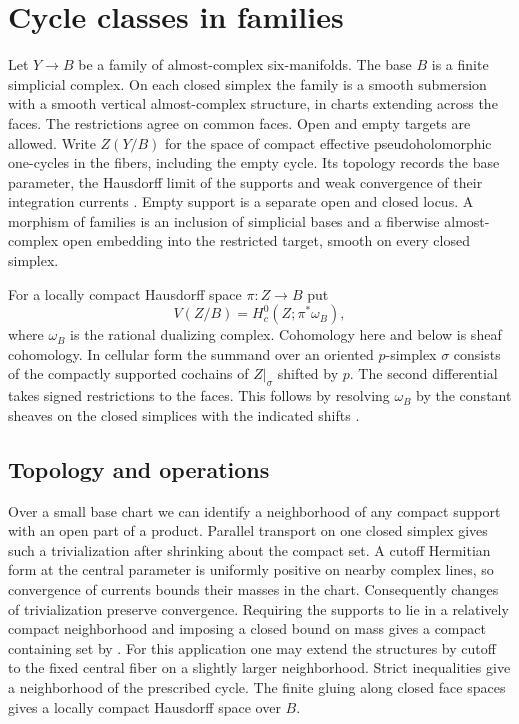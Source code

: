 \section{Cycle classes in families}\label{sec:families}

Let $Y\to B$ be a family of almost-complex six-manifolds. The base $B$
is a finite simplicial complex. On each closed simplex the family is
a smooth submersion with a smooth vertical almost-complex structure,
in charts extending across the faces. The restrictions agree on common
faces. Open and empty targets are allowed. Write $Z(Y/B)$ for the space of
compact effective pseudoholomorphic one-cycles in the fibers, including
the empty cycle. Its topology records the base parameter, the Hausdorff
limit of the supports and weak convergence of their integration currents
\cite[Definition~2.6]{DIW}. Empty support is a separate open and closed
locus. A morphism of families is an inclusion of simplicial bases and
a fiberwise almost-complex open embedding into the restricted target,
smooth on every closed simplex.

For a locally compact Hausdorff space $\pi:Z\to B$ put
\[
             V(Z/B)=H_c^0(Z;\pi^*\omega_B),
\]
where $\omega_B$ is the rational dualizing complex. Cohomology here
and below is sheaf cohomology. In cellular form the summand over
an oriented $p$-simplex $\sigma$ consists of the compactly supported
cochains of $Z|_\sigma$ shifted by $p$. The second differential takes
signed restrictions to the faces. This follows by resolving $\omega_B$
by the constant sheaves on the closed simplices with the indicated shifts
\cite[Definitions~2.2 and~3.1, Lemma~3.4]{Pardon}.

\subsection{Topology and operations}
Over a small base chart we can identify a neighborhood of any compact
support with an open part of a product. Parallel transport on one
closed simplex gives such a trivialization after shrinking about the
compact set. A cutoff Hermitian form at the central parameter is
uniformly positive on nearby complex lines, so convergence of currents
bounds their masses in the chart. Consequently changes of trivialization
preserve convergence. Requiring the supports to lie in a relatively
compact neighborhood and imposing a closed bound on mass gives a
compact containing set by \cite[Theorem~2.11]{DIW}. For this application
one may extend the structures by cutoff to the fixed central fiber
on a slightly larger neighborhood. Strict inequalities give a
neighborhood of the prescribed cycle. The finite gluing along closed
face spaces gives a locally compact Hausdorff space over $B$.

